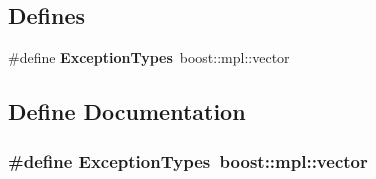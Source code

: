 \subsection*{Defines}
\begin{CompactItemize}
\item 
\#define {\bf Exception\-Types}~boost::mpl::vector
\end{CompactItemize}


\subsection{Define Documentation}
\subsubsection{\setlength{\rightskip}{0pt plus 5cm}\#define Exception\-Types~boost::mpl::vector}\label{_call_scheduler_8h_7b0728281b74431c605bc465dcb99027}


